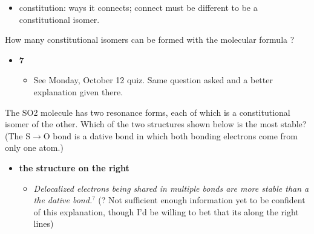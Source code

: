 \documentclass[12pt,a4paper]{article}
\begin{document}
\begin{enumerate}
\begin{itemize}
\begin{itemize}
                    \item constitution: ways it connects; connect must be {\color{o-Sun}different} to be a constitutional isomer.
                \end{itemize}
        \end{itemize}
    {\color{G-Moon}\item How many constitutional isomers can be formed with the molecular formula ?}
        \begin{itemize}
            \item {\color{o-Sun}\textbf{7}}
                \begin{itemize}
                    \item See Monday, October 12 quiz. Same question asked and a better explanation given there.
                \end{itemize}
        \end{itemize}
    \newpage
    {\color{G-Moon}\item The SO2 molecule has two resonance forms, each of which is a constitutional isomer of the other. Which of the two structures shown below is the most stable?  (The S$\rightarrow$O bond is a dative bond in which both bonding electrons come from only one atom.) }
        \begin{itemize}
            \item {\color{o-Sun}\textbf{the structure on the right}}
                \begin{itemize}
                    \item {\color{y-Sun}\textit{Delocalized electrons being shared in multiple bonds are more stable than a the dative bond.}\(^{?}\)} (? Not sufficient enough information yet to be confident of this explanation, though I'd be willing to bet that its along the right lines)
                \end{itemize}
        \end{itemize}
\end{enumerate}

\newpage
\end{document}
